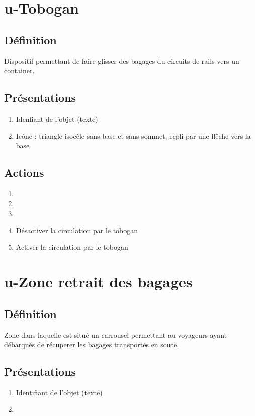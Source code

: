 \section{u-Tobogan}
\subsection{Définition}
	Dispositif permettant de faire glisser des bagages du circuits de rails vers un container.

\subsection{Présentations}
\begin{enumerate}
	\item Idenfiant de l'objet (texte)
	\item Icône : triangle isocèle sans base et sans sommet, repli par une flêche vers la base
\end{enumerate}

\subsection{Actions}
\begin{enumerate}
	\item {}
	\item {}
	\item \etat
	\item Désactiver la circulation par le tobogan
	\item Activer la circulation par le tobogan
\end{enumerate}


\section{u-Zone retrait des bagages}
\subsection{Définition}
	Zone dans laquelle est situé un carrousel permettant au voyageurs ayant débarqués de récuperer les bagages transportés
	en soute.

\subsection{Présentations}
\begin{enumerate}
	\item Identifiant de l'objet (texte)
	\item \rectetiquette
\end{enumerate}

